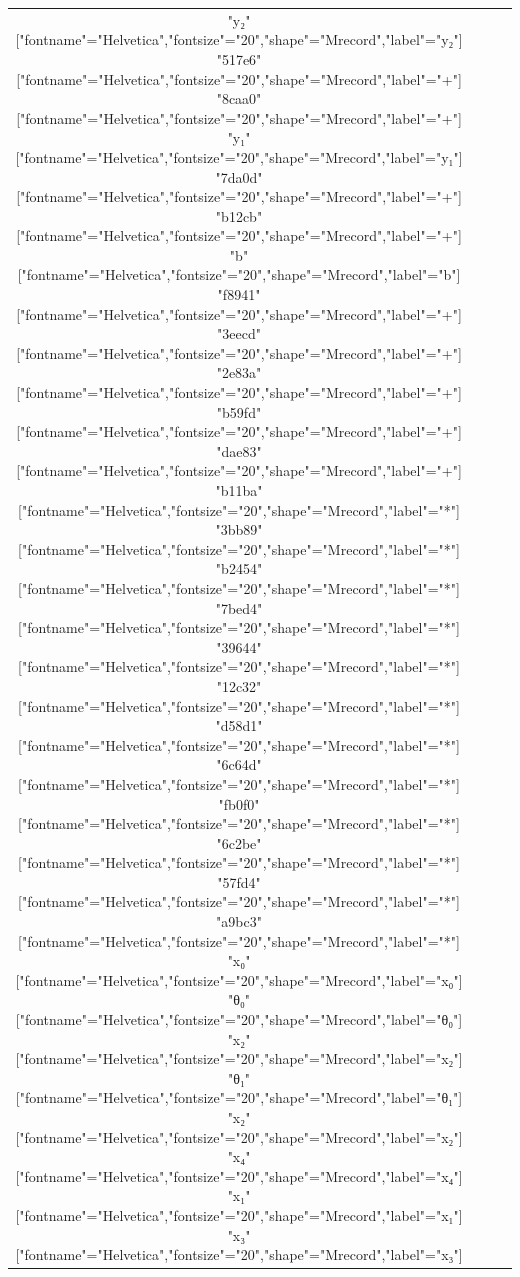 \documentclass[11pt]{article}
\begin{document}
\begin{table}[H]
\begin{tabular}{|c|c|c|c|}
\begin{adjustbox}{minipage={.22\textwidth}, height=0.14\textwidth, margin*=0cm -0.3cm 0cm 0.1cm}
{    "y₂" ["fontname"="Helvetica","fontsize"="20","shape"="Mrecord","label"="y₂"]
    "517e6" ["fontname"="Helvetica","fontsize"="20","shape"="Mrecord","label"="+"]
    "8caa0" ["fontname"="Helvetica","fontsize"="20","shape"="Mrecord","label"="+"]
    "y₁" ["fontname"="Helvetica","fontsize"="20","shape"="Mrecord","label"="y₁"]
    "7da0d" ["fontname"="Helvetica","fontsize"="20","shape"="Mrecord","label"="+"]
    "b12cb" ["fontname"="Helvetica","fontsize"="20","shape"="Mrecord","label"="+"]
    "b" ["fontname"="Helvetica","fontsize"="20","shape"="Mrecord","label"="b"]
    "f8941" ["fontname"="Helvetica","fontsize"="20","shape"="Mrecord","label"="+"]
    "3eecd" ["fontname"="Helvetica","fontsize"="20","shape"="Mrecord","label"="+"]
    "2e83a" ["fontname"="Helvetica","fontsize"="20","shape"="Mrecord","label"="+"]
    "b59fd" ["fontname"="Helvetica","fontsize"="20","shape"="Mrecord","label"="+"]
    "dae83" ["fontname"="Helvetica","fontsize"="20","shape"="Mrecord","label"="+"]
    "b11ba" ["fontname"="Helvetica","fontsize"="20","shape"="Mrecord","label"="*"]
    "3bb89" ["fontname"="Helvetica","fontsize"="20","shape"="Mrecord","label"="*"]
    "b2454" ["fontname"="Helvetica","fontsize"="20","shape"="Mrecord","label"="*"]
    "7bed4" ["fontname"="Helvetica","fontsize"="20","shape"="Mrecord","label"="*"]
    "39644" ["fontname"="Helvetica","fontsize"="20","shape"="Mrecord","label"="*"]
    "12c32" ["fontname"="Helvetica","fontsize"="20","shape"="Mrecord","label"="*"]
    "d58d1" ["fontname"="Helvetica","fontsize"="20","shape"="Mrecord","label"="*"]
    "6c64d" ["fontname"="Helvetica","fontsize"="20","shape"="Mrecord","label"="*"]
    "fb0f0" ["fontname"="Helvetica","fontsize"="20","shape"="Mrecord","label"="*"]
    "6c2be" ["fontname"="Helvetica","fontsize"="20","shape"="Mrecord","label"="*"]
    "57fd4" ["fontname"="Helvetica","fontsize"="20","shape"="Mrecord","label"="*"]
    "a9bc3" ["fontname"="Helvetica","fontsize"="20","shape"="Mrecord","label"="*"]
    "x₀" ["fontname"="Helvetica","fontsize"="20","shape"="Mrecord","label"="x₀"]
    "θ₀" ["fontname"="Helvetica","fontsize"="20","shape"="Mrecord","label"="θ₀"]
    "x₂" ["fontname"="Helvetica","fontsize"="20","shape"="Mrecord","label"="x₂"]
    "θ₁" ["fontname"="Helvetica","fontsize"="20","shape"="Mrecord","label"="θ₁"]
    "x₂" ["fontname"="Helvetica","fontsize"="20","shape"="Mrecord","label"="x₂"]
    "x₄" ["fontname"="Helvetica","fontsize"="20","shape"="Mrecord","label"="x₄"]
    "x₁" ["fontname"="Helvetica","fontsize"="20","shape"="Mrecord","label"="x₁"]
    "x₃" ["fontname"="Helvetica","fontsize"="20","shape"="Mrecord","label"="x₃"]
}
\end{adjustbox}
\end{tabular}
\end{table}
\end{document}
